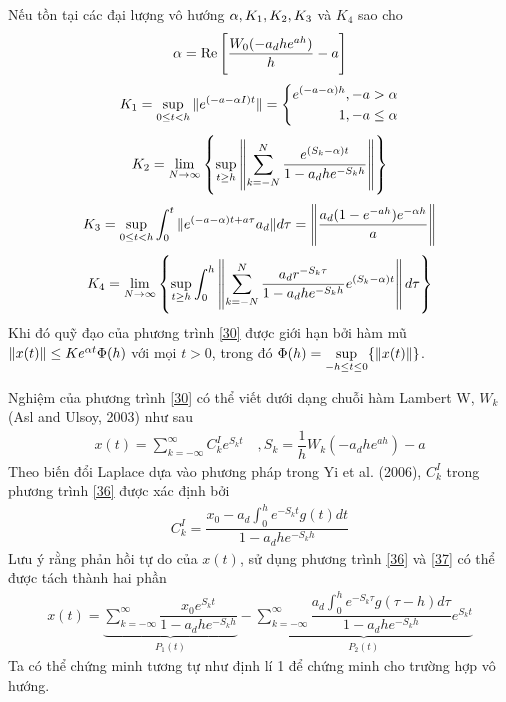 \begin{hq}
	Nếu tồn tại các đại lượng vô hướng $\alpha, K_1, K_2, K_3$ và $K_4$ sao cho
	\begin{align}\label{31}
		\alpha = \mathrm{Re} \left[ \dfrac{W_0(-a_dhe^{ah})}{h} - a\right]
	\end{align}
\begin{align}\label{32}
	K_1 = \sup \limits_{0 \le t <h} \Vert e^{(-a - \alpha I)t} \Vert 
	= \left\{\begin{aligned} e^{(-a-\alpha)h}, -a > \alpha\\1, -a \le \alpha\end{aligned}\right.
\end{align}
\begin{align}\label{33}
	K_2 = \lim\limits_{N \to \infty} \left\{ \sup \limits_{t \ge h}\left \Vert \sum_{k=-N}^N \dfrac{e^{(S_k-\alpha)t}}{1-a_dhe^{-S_kh}} \right \Vert\right\}
\end{align}
\begin{align}\label{34}
	K_3 = \sup\limits_{0 \le t <h}\int_0^t \Vert e^{(-a - \alpha)t + a\tau}a_d\Vert d\tau = \left \Vert \dfrac{a_d(1-e^{-ah})e^{-\alpha h}}{a}\right \Vert
\end{align}
\begin{align}\label{35}
	K_4= \lim\limits_{N\to \infty} \left\{\sup\limits_{t \ge h} \int_0^h\left\Vert \sum_{k=-N}^N \dfrac{a_dr^{-S_k\tau}}{1-a_dhe^{-S_kh}}e^{(S_k-\alpha)t} \right\Vert d\tau \right\}
\end{align}
Khi đó quỹ đạo của phương trình \eqref{30} được giới hạn bởi hàm mũ $\Vert x(t) \Vert \le K e^{\alpha t} \Phi (h)$ với mọi $t >0$, trong đó $\Phi(h) = \sup \limits_{-h \le t \le 0}\{ \Vert x(t)\Vert\}$.
\end{hq}
\begin{cm}
	Nghiệm của phương trình \eqref{30} có thể viết dưới dạng chuỗi hàm Lambert W, $W_k$ (Asl and Ulsoy, 2003) như sau
\begin{align}\label{36}
	x(t) = \sum_{k = -\infty}^{\infty} C^I_ke^{S_kt} \quad , S_k = \dfrac{1}{h}W_k(-a_dhe^{ah})-a
\end{align}	
Theo biến đổi Laplace dựa vào phương pháp trong Yi et al. (2006),  $C_k^I$ trong phương trình \eqref{36} được xác định bởi
\begin{align}\label{37}
	C_k^I = \dfrac{x_0 -a_d\int_{0}^{h}e^{-S_kt}g(t)dt}{1-a_dhe^{-S_kh}}
\end{align}
Lưu ý rằng phản hồi tự do của $x(t)$, sử dụng phương trình \eqref{36} và \eqref{37} có thể được tách thành hai phần
\begin{align}\label{38}
	x(t) = \underbrace{\sum_{k=-\infty}^{\infty} \dfrac{x_0e^{S_kt}}{1-a_dhe^{-S_kh}}}_{P_1(t)} - \underbrace{\sum_{k=-\infty}^{\infty} \dfrac{a_d\int_0^he^{-S_k\tau}g(\tau-h)d\tau}{1-a_dhe^{-S_kh}}e^{S_kt}}_{P_2(t)}
\end{align}
Ta có thể chứng minh tương tự như định lí 1 để chứng minh cho trường hợp vô hướng.
\end{cm}
